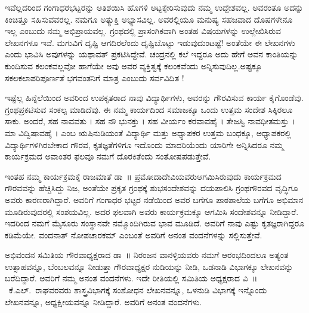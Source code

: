 {ಇವೆಲ್ಲದರಿಂದ ಗಂಗಾಧರಭಟ್ಟರನ್ನು ಅತಿಶಯಿಸಿ ಹೊಗಳಿ ಅಟ್ಟಕ್ಕೇರಿಸುವುದು ನಮ್ಮ ಉದ್ದೇಶವಲ್ಲ. ಅವರಂತೂ ಅದನ್ನು ಕಿಂಚಿತ್ತೂ ಸಹಿಸುವವರಲ್ಲ. ನಮಗೂ ಅತ್ಯುಕ್ತಿ ಅಭ್ಯಾಸವಿಲ್ಲ. ಅವರಲ್ಲಿಯೂ ಮನುಷ್ಯ ಸಹಜವಾದ ದೊಷಗಳೇನೂ ಇಲ್ಲ ಎಂಬುದು ನಮ್ಮ ಅಭಿಪ್ರಾಯವಲ್ಲ. ಗ್ರಂಥದಲ್ಲಿ ಪ್ರಾಸಂಗಿಕವಾಗಿ ಅಂತಹ ವಿಷಯಗಳನ್ನು ಉಲ್ಲೇಖಿಸಿರುವ ಲೇಖನಗಳೂ ಇವೆ. ಮಗುವಿಗೆ ದೃಷ್ಟಿ ಆಗದಿರಲೆಂದು ದೃಷ್ಟಿಬೊಟ್ಟು ಇಡುವುದುಂಟಷ್ಟೆ! ಅಂತೆಯೇ ಈ ಲೇಖನಗಳು ಎಂದು ಭಾವಿಸಿ ಅವುಗಳನ್ನು ಯಥಾವತ್ ಪ್ರಕಟಿಸಿದ್ದೇವೆ. ಚಂದ್ರನಲ್ಲಿ ಕಲೆ ಇದ್ದರೂ ಅದು ಹೇಗೆ ಅವನ ಕಾಂತಿಯನ್ನು ಕುಂದಿಸುವ ಕಲಂಕವಲ್ಲವೋ ಹಾಗೆಯೇ ಅವು ಅವರ ವ್ಯಕ್ತಿತ್ವಕ್ಕೆ ಕಲಂಕವೆಂದು ಅನ್ನಿಸುವುದಿಲ್ಲ.\break ಅಷ್ಟಕ್ಕೂ ಸಕಲಕಲಾಪರಿಪೂರ್ಣತೆ ಭಗವಂತನಿಗೆ ಮಾತ್ರ ಎಂಬುದು ಸರ್ವವಿದಿತ !

 
ಇಷ್ಟೆಲ್ಲ ಹಿನ್ನೆಲೆಯಿಂದ ಅವರಿಂದ ಉಪಕೃತರಾದ ನಾವು \enginline{-} ವಿದ್ಯಾರ್ಥಿಗಳು, ಅವರನ್ನು ಗೌರವಿಸುವ ಕಾರ್ಯ ಕೈಗೊಂಡೆವು. ಗ್ರಂಥಪ್ರಕಟಿಸುವ ಸಂಕಲ್ಪ ಮಾಡಿದೆವು. ಈ ನಮ್ಮ ಕಾರ್ಯದಿಂದ ಸಮಾಜಕ್ಕೂ ಒಂದು  ಉತ್ತಮ ಸಂದೇಶ ಸಿಕ್ಕಿರಲೂ ಸಾಕು. ಅಂದರೆ, ಸಹ ನಾವವತು । ಸಹ ನೌ ಭುನಕ್ತು । ಸಹ ವೀರ್ಯಂ ಕರವಾವಹೈ । ತೇಜಸ್ವಿ \break ನಾವಧೀತಮಸ್ತು । ಮಾ ವಿದ್ವಿಷಾವಹೈ । ಎಂಬ ಋಷಿನುಡಿಯಂತೆ ವಿದ್ಯಾರ್ಥಿ ಮತ್ತು ಅಧ್ಯಾಪಕರ ಉತ್ತಮ ಬಂಧಕ್ಕೂ, ಅಧ್ಯಾಪಕರಲ್ಲಿ ವಿದ್ಯಾರ್ಥಿಗಳಿಗಿರಬೇಕಾದ ಗೌರವ, ಕೃತಜ್ಞತೆಗಳಿಗೂ ಇದೊಂದು ಮಾದರಿಯೆಂದು ಯಾರಿಗೇ ಅನ್ನಿಸಿದರೂ ನಮ್ಮ ಕಾರ್ಯಕ್ರಮದ ಅವಾಂತರ ಫಲವೂ ನಮಗೆ ದೊರಕಿತೆಂದು ಸಂತೋಷ\break ಪಡುತ್ತೇವೆ.


ಇಂತಹ ನಮ್ಮ ಕಾರ್ಯಕ್ರಮಕ್ಕೆ ರಾಜಮಾತೆ ಡಾ~॥ ಪ್ರಮೋದಾದೇವಿಯವರು\break ಆಗಮಿಸಿರುವುದು ಕಾರ್ಯಕ್ರಮದ ಗೌರವವನ್ನು ಹೆಚ್ಚಿಸಿದ್ದು ನಿಜ, ಅಂತೆಯೇ ಪ್ರಕೃತ ಗ್ರಂಥಕ್ಕೆ ಶುಭಸಂದೇಶವನ್ನು ದಯಪಾಲಿಸಿ ಗ್ರಂಥಗೌರವದ ವೃದ್ಧಿಗೂ ಅವರು ಕಾರಣರಾಗಿದ್ದಾರೆ. ಅವರಿಗೆ ಗಂಗಾಧರ ಭಟ್ಟರ ನಡೆಯಿಂದ ಅವರ ಬಗೆಗೂ ಪಾಠಶಾಲೆಯ ಬಗೆಗೂ  ಅಭಿಮಾನ ಮೂಡಿರುವುದರಲ್ಲಿ ಸಂಶಯವಿಲ್ಲ. ಅದರ ಫಲವಾಗಿ ಅವರು ಕಾರ್ಯ\-ಕ್ರಮಕ್ಕೂ ಆಗಮಿಸಿ ಸಂದೇಶವನ್ನೂ ನೀಡಿದ್ದಾರೆ. ಇದರಿಂದ ನಮಗೆ ಮೈಸೂರು ಸಂಸ್ಥಾನವೇ ನಮ್ಮೊಂದಿಗಿರುವ ಭಾವ ಮೂಡಿದೆ. ಅವರಿಗೆ ನಾವು ಎಷ್ಟು  ಕೃತಜ್ಞ\-ರಾಗಿದ್ದರೂ ಕಡಿಮೆಯೇ. ವಂದನಾತ್ ನೋಪಚಾರಕಮ್ ಎಂಬಂತೆ ಅವರಿಗೆ ಅನಂತ ವಂದನೆಗಳನ್ನು  ಸಲ್ಲಿಸುತ್ತೇವೆ.

  
ಅಭಿವಂದನ ಸಮಿತಿಯ ಗೌರವಾಧ್ಯಕ್ಷರಾದ ಡಾ~॥ ನಿರಂಜನ \hbox{ವಾನಳ್ಳಿಯವರು} ನಮಗೆ ಆರಂಭದಿಂದಲೂ ಅತ್ಯಂತ ಉತ್ಸಾಹವನ್ನೂ, ಬೆಂಬಲವನ್ನೂ ನೀಡುತ್ತಾ ಗೌರವಾಧ್ಯಕ್ಷರ ನುಡಿಯನ್ನು ನೀಡಿ, ಒಡನಾಡಿ ವಿಭಾಗಕ್ಕೂ ಲೇಖನವನ್ನು  ಬರೆದಿದ್ದಾರೆ. ಅವರಿಗೆ ನಮ್ಮ ಅನಂತ ವಂದನೆಗಳು. ಇದೇ ರೀತಿಯಲ್ಲಿ ಸಮಿತಿಯ ಅಧ್ಯಕ್ಷರಾದ \hbox{ವಿ~॥ ಕೆ.ಎಲ್. ರಾಘವರವರು} ಶಾಸ್ತ್ರವಿಭಾಗಕ್ಕೆ ಸಂಶೋಧನ ಲೇಖನವನ್ನೂ, ಒಳನುಡಿ \hbox{ವಿಭಾಗಕ್ಕೆ} ಇನ್ನೊಂದು ಲೇಖನವನ್ನೂ, ಅಧ್ಯಕ್ಷೀಯವನ್ನೂ ನೀಡಿದ್ದಾರೆ. ಅವರಿಗೆ ಅನಂತ ವಂದನೆಗಳು.


}
